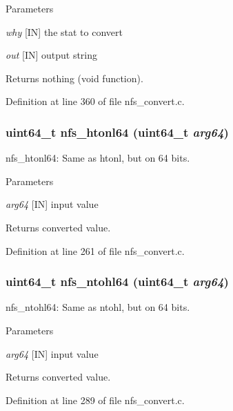\begin{DoxyParams}{Parameters}
\item[{\em why}][IN] the stat to convert \item[{\em out}][IN] output string\end{DoxyParams}
\begin{DoxyReturn}{Returns}
nothing (void function). 
\end{DoxyReturn}


Definition at line 360 of file nfs\_\-convert.c.
\subsubsection[{nfs\_\-htonl64}]{\setlength{\rightskip}{0pt plus 5cm}uint64\_\-t nfs\_\-htonl64 (uint64\_\-t {\em arg64})}\label{nfs__convert_8c_ab52fdbc875109ccb84900a657877a23b}
nfs\_\-htonl64: Same as htonl, but on 64 bits.


\begin{DoxyParams}{Parameters}
\item[{\em arg64}][IN] input value\end{DoxyParams}
\begin{DoxyReturn}{Returns}
converted value. 
\end{DoxyReturn}


Definition at line 261 of file nfs\_\-convert.c.
\subsubsection[{nfs\_\-ntohl64}]{\setlength{\rightskip}{0pt plus 5cm}uint64\_\-t nfs\_\-ntohl64 (uint64\_\-t {\em arg64})}\label{nfs__convert_8c_a87865063f614e91e712203f47c423cb6}
nfs\_\-ntohl64: Same as ntohl, but on 64 bits.


\begin{DoxyParams}{Parameters}
\item[{\em arg64}][IN] input value\end{DoxyParams}
\begin{DoxyReturn}{Returns}
converted value. 
\end{DoxyReturn}


Definition at line 289 of file nfs\_\-convert.c.
